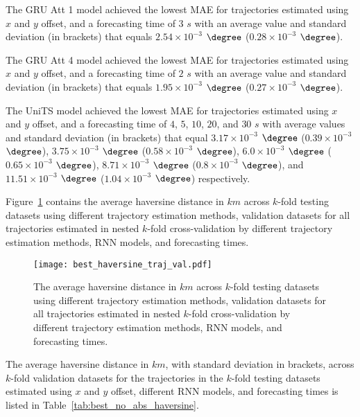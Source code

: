 The GRU Att 1 model achieved the lowest MAE for trajectories estimated using $x$ and $y$ offset, and a forecasting time of $3$ $s$ with an average value and standard deviation (in brackets) that equals $2.54 \times 10^{-3}$ $\degree$ ($0.28 \times 10^{-3}$ $\degree$).

The GRU Att 4 model achieved the lowest MAE for trajectories estimated using $x$ and $y$ offset, and a forecasting time of $2$ $s$ with an average value and standard deviation (in brackets) that equals $1.95 \times 10^{-3}$ $\degree$ ($0.27 \times 10^{-3}$ $\degree$).

The UniTS model achieved the lowest MAE for trajectories estimated using $x$ and $y$ offset, and a forecasting time of $4$, $5$, $10$, $20$, and $30$ $s$ with average values and standard deviation (in brackets) that equal $3.17 \times 10^{-3}$ $\degree$ ($0.39 \times 10^{-3}$ $\degree$), $3.75 \times 10^{-3}$ $\degree$ ($0.58 \times 10^{-3}$ $\degree$), $6.0 \times 10^{-3}$ $\degree$ ($0.65 \times 10^{-3}$ $\degree$), $8.71 \times 10^{-3}$ $\degree$ ($0.8 \times 10^{-3}$ $\degree$), and $11.51 \times 10^{-3}$ $\degree$ ($1.04 \times 10^{-3}$ $\degree$) respectively.

Figure~\ref{fig:best_haversine_traj_val} contains the average haversine distance in $km$ across $k$-fold testing datasets using different trajectory estimation methods, validation datasets for all trajectories estimated in nested $k$-fold cross-validation by different trajectory estimation methods, RNN models, and forecasting times.

\begin{figure}[!ht]
	\centering
	\texttt{[image: best\_haversine\_traj\_val.pdf]}
	\caption{The average haversine distance in $km$ across $k$-fold testing datasets using different trajectory estimation methods, validation datasets for all trajectories estimated in nested $k$-fold cross-validation by different trajectory estimation methods, RNN models, and forecasting times.}
	\label{fig:best_haversine_traj_val}
\end{figure}

The average haversine distance in $km$, with standard deviation in brackets, across $k$-fold validation datasets for the trajectories in the $k$-fold testing datasets estimated using $x$ and $y$ offset, different RNN models, and forecasting times is listed in Table~\ref{tab:best_no_abs_haversine}.

